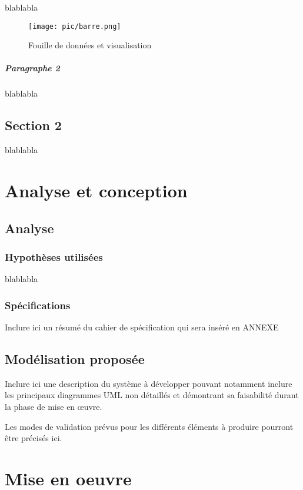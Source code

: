 \documentclass{polytech/polytech}
\numberwithin{figure}{chapter}
\begin{document}
blablabla

\begin{figure*}[ht] 
    \centering 
    \texttt{[image: pic/barre.png]} 
    \caption{Fouille de données et visualisation} 
    \label{fdv} 
\end{figure*}

\paragraph{Paragraphe 2}

blablabla

\section{Section 2}

blablabla


\chapter{Analyse et conception}

\section{Analyse}

\subsection{Hypothèses utilisées}
blablabla

\subsection{Spécifications}
Inclure ici un résumé du cahier de spécification qui sera inséré en ANNEXE

\section{Modélisation proposée}

Inclure ici une description du système à développer
pouvant notamment inclure les principaux diagrammes UML non détaillés
et démontrant sa faisabilité durant la phase de mise en œuvre.

Les modes de validation prévus pour les différents éléments à produire
pourront être précisés ici.

\chapter{Mise en oeuvre}
\end{document}
